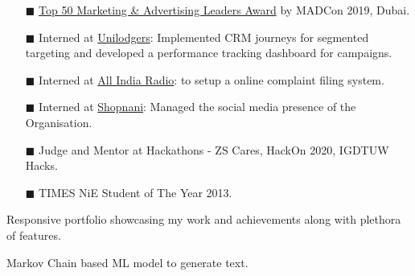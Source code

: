 



\begin{itemize}
    \item [$\blacksquare$] {\color{LightGrey} \color{mecol}\href{https://drive.google.com/drive/folders/1W8HZmATotqPVJcRV8dol9LuKinMlSWxu?usp=sharing }{Top 50 Marketing \& Advertising Leaders Award} \color{LightGrey}by MADCon 2019,  Dubai.}
    
     
      
     \item [$\blacksquare$] { Interned at {\href{https://www.unilodgers.com/} {Unilodgers}}: Implemented CRM journeys for segmented targeting and developed a performance tracking dashboard for campaigns. }
     
      \item [$\blacksquare$] { Interned at {\href{https://newsonair.gov.in/} {All India Radio}}: to setup a online complaint filing system. }
     
     \item [$\blacksquare$] { Interned at {\href{https://angel.co/company/shopnani-1}{Shopnani}}: Managed the social media presence of the Organisation. }
     
      \item [$\blacksquare$] { Judge and Mentor at Hackathons - ZS Cares, HackOn 2020,  IGDTUW Hacks.}
      
      \item [$\blacksquare$] { TIMES NiE Student of The Year 2013.}
    
    \end{itemize}



{ Responsive portfolio showcasing my work and achievements along with plethora of features. }



    {Markov Chain based ML model to generate text. }




